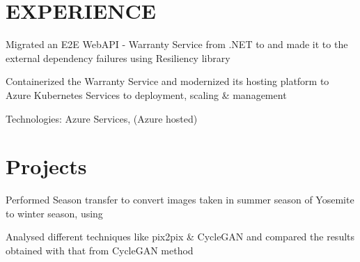 \documentclass[]{deedy-resume-openfont}
\begin{document}
\begin{minipage}[t]{0.66\textwidth} 

\section{EXPERIENCE}

\vspace{\topsep} %
\begin{tightemize}\item Migrated an E2E WebAPI - Warranty Service from .NET to  and made it  to the external dependency failures using Resiliency library\\
\item Containerized the Warranty Service and modernized its hosting platform to Azure Kubernetes Services to deployment, scaling \& management\\
\item Technologies: Azure Services,  (Azure hosted)\end{tightemize}
\sectionsep
\section{Projects}

\begin{tightemize}\item Performed Season transfer to convert images taken in summer season of Yosemite to winter season, using \\
\item Analysed different techniques like pix2pix \& CycleGAN and compared the results obtained with that from CycleGAN method\end{tightemize}
\sectionsep
\sectionsep



\end{minipage}
\end{document}
